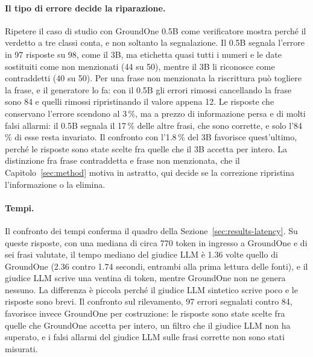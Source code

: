 \paragraph{Il tipo di errore decide la riparazione.} Ripetere il caso di studio con GroundOne 0.5B come verificatore mostra
perché il verdetto a tre classi conta, e non soltanto la segnalazione. Il 0.5B segnala l'errore in 97 risposte su 98, come
il 3B, ma etichetta quasi tutti i numeri e le date sostituiti come non menzionati (44 su 50), mentre il 3B li riconosce come
contraddetti (40 su 50). Per una frase non menzionata la riscrittura può togliere la frase, e il generatore lo fa: con il 0.5B gli errori rimossi cancellando la frase sono 84 e quelli rimossi ripristinando il valore appena 12. Le risposte che
conservano l'errore scendono al 3\,\%, ma a prezzo di informazione persa e di molti falsi allarmi: il 0.5B segnala il 17\,\% delle altre frasi, che sono corrette, e solo l'84\,\% di esse resta invariato. Il confronto con l'1.8\,\% del 3B favorisce quest'ultimo, perché le risposte sono state scelte fra quelle che il 3B accetta per intero. La distinzione fra frase contraddetta e frase non
menzionata, che il Capitolo~\ref{sec:method} motiva in astratto, qui decide se la correzione ripristina l'informazione o
la elimina.

\paragraph{Tempi.} Il confronto dei tempi conferma il quadro della Sezione~\ref{sec:results-latency}. Su queste risposte,
con una mediana di circa 770 token in ingresso a GroundOne e di sei frasi valutate, il tempo mediano del giudice LLM è 1.36 volte quello di GroundOne (2.36 contro 1.74 secondi, entrambi alla prima lettura delle fonti), e il giudice LLM scrive una ventina di token, mentre GroundOne non ne genera nessuno. La
differenza è piccola perché il giudice LLM sintetico scrive poco e le risposte sono brevi. Il confronto sul rilevamento, 97
errori segnalati contro 84, favorisce invece GroundOne per costruzione: le risposte sono state scelte fra quelle che
GroundOne accetta per intero, un filtro che il giudice LLM non ha superato, e i falsi allarmi del giudice LLM sulle frasi corrette
non sono stati misurati.

